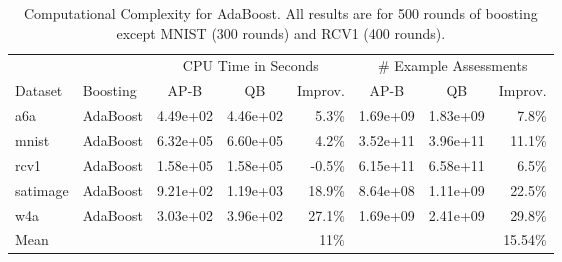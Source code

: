 \begin{table*}[ht]
\caption{Computational Complexity for AdaBoost.
All results are for 500 rounds of boosting except MNIST (300 rounds) and RCV1 (400 rounds).}
\label{complexity-exact-results}	
\vskip 0.15in
\begin{center}
\begin{small}
\begin{sc}
\begin{tabular}{llccrccr}
\toprule
& & \multicolumn{3}{c}{CPU Time in Seconds} & \multicolumn{3}{c}{\# Example Assessments} \\
Dataset & Boosting & AP-B & QB & Improv. & AP-B & QB & Improv. \\
\midrule
a6a & AdaBoost & 4.49e+02 & 4.46e+02 & 5.3\% & 1.69e+09 & 1.83e+09 & 7.8\% \\
%
mnist & AdaBoost & 6.32e+05 & 6.60e+05 & 4.2\% & 3.52e+11 & 3.96e+11 & 11.1\% \\
%
rcv1 & AdaBoost & 1.58e+05 & 1.58e+05 & -0.5\% & 6.15e+11 & 6.58e+11 & 6.5\% \\
%
satimage & AdaBoost & 9.21e+02 & 1.19e+03 & 18.9\% & 8.64e+08 & 1.11e+09 & 22.5\% \\
%
w4a & AdaBoost & 3.03e+02 & 3.96e+02 & 27.1\% & 1.69e+09 & 2.41e+09 & 29.8\% \\
\midrule
Mean &  & &  & 11\% & & & 15.54\% \\
\bottomrule
\end{tabular}
\end{sc}
\end{small}
\end{center}
\vskip -0.1in
\end{table*}

